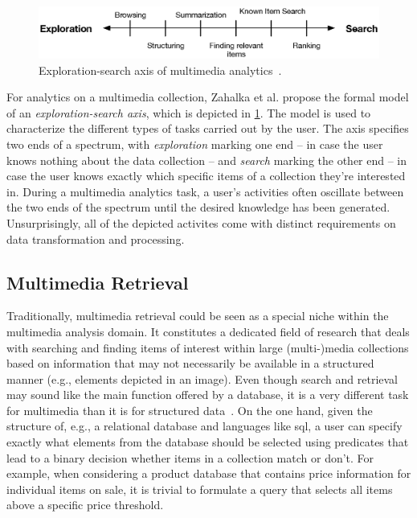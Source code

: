 \begin{figure}[h]
    \centering
    \includegraphics[width=\textwidth]{figures/exploration_search_axis.eps}
    \caption{Exploration-search axis of multimedia analytics~\cite{Zahalka:2014towards}.}
    \label{figure:exploration-search-axis}
\end{figure}

For analytics on a multimedia collection, Zahalka et al. \cite{Zahalka:2014towards} propose the formal model of an \emph{exploration-search axis}, which is depicted in \cref{figure:exploration-search-axis}. The model is used to characterize the different types of tasks carried out by the user. The axis specifies two ends of a spectrum, with \emph{exploration} marking one end -- in case the user knows nothing about the data collection -- and \emph{search} marking the other end -- in case the user knows exactly which specific items of a collection they're interested in. During a multimedia analytics task, a user's activities often oscillate between the two ends of the spectrum until the desired knowledge has been generated. Unsurprisingly, all of the depicted activites come with distinct requirements on data transformation and processing.

\subsection{Multimedia Retrieval}

Traditionally, multimedia retrieval could be seen as a special niche within the  multimedia analysis domain. It constitutes a dedicated field of research that deals with searching and finding items of interest within large (multi-)media collections based on information that may not necessarily be available in a structured manner (e.g., elements depicted in an image). Even though search and retrieval may sound like the main function offered by a database, it is a very different task for multimedia than it is for structured data~\cite{Blanken:2007multimedia}. On the one hand, given the structure of, e.g., a relational database and languages like \acrshort{sql}, a user can specify exactly what elements from the database should be selected using predicates that lead to a binary decision whether items in a collection match or don't. For example, when considering a product database that contains price information for individual items on sale, it is trivial to formulate a query that selects all items above a specific price threshold.

